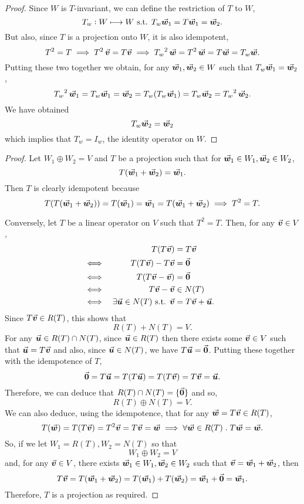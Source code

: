 \documentclass[../MathsNotesBase.tex]{subfiles}
\begin{document}
{\begin{proof}
		Since $W$ is $T$-invariant, we can define the restriction of $T$ to $W$,
		\[ T_w : W \longmapsto W \text{ s.t. } T_w\vec{\bm{w}}_1 = T\vec{\bm{w}}_1 = \vec{\bm{w}}_2. \]
		But also, since $T$ is a projection onto $W$, it is also idempotent,
		\[ T^2 = T \implies T^2\,\vec{\bm{v}} = T\vec{\bm{v}} \implies {T_w}^2\,\vec{\bm{w}} = T^2\,\vec{\bm{w}} = T\vec{\bm{w}} = T_w\vec{\bm{w}}. \]
		Putting these two together we obtain, for any ${ \vec{\bm{w}}_1,\vec{\bm{w}}_2 \in W }$ such that ${ T_w\vec{\bm{w}}_1 = \vec{\bm{w}}_2 }$,
		\[ {T_w}^2\,\vec{\bm{w}}_1 = T_w\vec{\bm{w}}_1 = \vec{\bm{w}}_2 = T_w(T_w\vec{\bm{w}}_1) = T_w\vec{\bm{w}}_2 = {T_w}^2\,\vec{\bm{w}}_2. \]
		We have obtained 
		\[ T_w\vec{\bm{w}}_2 = \vec{\bm{w}}_2 \]
		which implies that ${ T_w = I_w }$, the identity operator on $W$.
	\end{proof}


	\bigskip
	\begin{proof}
		Let ${ W_1 \oplus W_2 = V }$ and $T$ be a projection such that for ${ \vec{\bm{w}}_1 \in W_1, \vec{\bm{w}}_2 \in W_2 }$,
		\[ T(\vec{\bm{w}}_1 + \vec{\bm{w}}_2) = \vec{\bm{w}}_1. \]
		Then $T$ is clearly idempotent because
		\[ T(T(\vec{\bm{w}}_1 + \vec{\bm{w}}_2)) = T(\vec{\bm{w}}_1) = \vec{\bm{w}}_1 = T(\vec{\bm{w}}_1 + \vec{\bm{w}}_2) \implies T^2 = T. \]
		
		\nl
		Conversely, let $T$ be a linear operator on $V$ such that ${ T^2 = T }$. Then, for any ${ \vec{\bm{v}} \in V }$,
		\[\begin{aligned}
			&& T(T\vec{\bm{v}}) &= T\vec{\bm{v}} \\
			&\iff & T(T\vec{\bm{v}}) - T\vec{\bm{v}} &= \vec{\bm{0}} &\text{\scriptsize{}} \\
			&\iff & T(T\vec{\bm{v}} - \vec{\bm{v}}) &= \vec{\bm{0}} &\text{\scriptsize{}} \\
			&\iff & T\vec{\bm{v}} - \vec{\bm{v}} &\in N(T) &\text{\scriptsize{}} \\
			&\iff & \exists \vec{\bm{u}} \in N(T) \text{ s.t. } \vec{\bm{v}} &= T\vec{\bm{v}} + \vec{\bm{u}}.
		\end{aligned}\]
		Since ${ T\vec{\bm{v}} \in R(T) }$, this shows that
		\[ R(T) + N(T) = V. \]
		For any ${ \vec{\bm{u}} \in R(T) \cap N(T) }$, since ${ \vec{\bm{u}} \in R(T) }$ then there exists some ${ \vec{\bm{v}} \in V }$ such that ${ \vec{\bm{u}} = T\vec{\bm{v}} }$ and also, since ${ \vec{\bm{u}} \in N(T) }$, we have ${ T\vec{\bm{u}} = \vec{\bm{0}} }$. Putting these together with the idempotence of $T$,
		\[ \vec{\bm{0}} = T\vec{\bm{u}} = T(T\vec{\bm{u}}) = T(T\vec{\bm{v}}) = T\vec{\bm{v}} = \vec{\bm{u}}. \]
		Therefore, we can deduce that ${ R(T) \cap N(T) = \{\vec{\bm{0}}\} }$ and so,
		\[ R(T) \oplus N(T) = V. \]	
		We can also deduce, using the idempotence, that for any ${ \vec{\bm{w}} = T\vec{\bm{v}} \in R(T) }$,
		\[ T(\vec{\bm{w}}) = T(T\vec{\bm{v}}) = T^2\vec{\bm{v}} = T\vec{\bm{v}} = \vec{\bm{w}} \implies \forall \vec{\bm{w}} \in R(T) \;.\; T\vec{\bm{w}} = \vec{\bm{w}}. \]
		So, if we let ${ W_1 = R(T), W_2 = N(T) }$ so that
		\[ W_1 \oplus W_2 = V \]
		and, for any ${ \vec{\bm{v}} \in V }$, there exists ${ \vec{\bm{w}}_1 \in W_1, \vec{\bm{w}}_2 \in W_2 }$ such that $ \vec{\bm{v}} = \vec{\bm{w}}_1 + \vec{\bm{w}}_2 $, then
		\[ T\vec{\bm{v}} = T(\vec{\bm{w}}_1 + \vec{\bm{w}}_2) = T(\vec{\bm{w}}_1) + T(\vec{\bm{w}}_2) = \vec{\bm{w}}_1 + \vec{\bm{0}} = \vec{\bm{w}}_1. \] 
		Therefore, $T$ is a projection as required.
	\end{proof}


}
\end{document}
